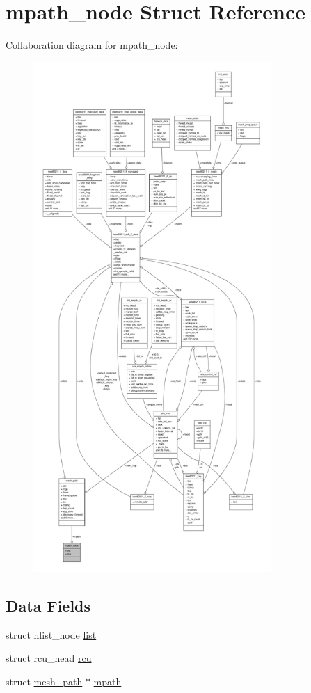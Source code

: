\hypertarget{structmpath__node}{\section{mpath\-\_\-node Struct Reference}
\label{structmpath__node}
}


Collaboration diagram for mpath\-\_\-node\-:
\nopagebreak
\begin{figure}[H]
\begin{center}
\leavevmode
\includegraphics[height=550pt]{structmpath__node__coll__graph}
\end{center}
\end{figure}
\subsection*{Data Fields}
\begin{DoxyCompactItemize}
\item 
struct hlist\-\_\-node \hyperlink{structmpath__node_a71d95aff87c97c965ee946427631cddf}{list}
\item 
struct rcu\-\_\-head \hyperlink{structmpath__node_aa9677537ffa4e40f3c4f3e9fb3b4c76d}{rcu}
\item 
struct \hyperlink{structmesh__path}{mesh\-\_\-path} $\ast$ \hyperlink{structmpath__node_a90b46ef3dc111348ebc8b6108f58b87e}{mpath}
\end{DoxyCompactItemize}


